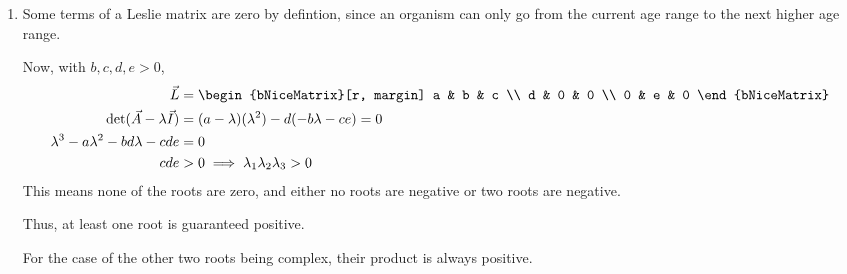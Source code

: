 \begin{enumerate}
    \item Some terms of a Leslie matrix are zero by defintion, since an organism
          can only go from the current age range to the next higher age range. \par
          Now, with $ b,c,d,e > 0 $,
          \begin{align}
              \vec{L}                        & =
              \begin{bNiceMatrix}[r, margin]
                  a & b & c \\
                  d & 0 & 0 \\
                  0 & e & 0
              \end{bNiceMatrix}                              \\
              \det(\vec{A} - \lambda\vec{I}) & = (a-\lambda) (\lambda^2)
              - d(-b\lambda - ce) = 0                                    \\
              \lambda^3 - a\lambda^2
              - bd\lambda - cde              & = 0                       \\
              cde                            & > 0 \implies
              \lambda_1 \lambda_2 \lambda_3  > 0
          \end{align}
          This means none of the roots are zero, and either no roots are negative or
          two roots are negative. \par
          Thus, at least one root is guaranteed positive. \par
          For the case of the other two roots being complex, their product is always
          positive.

\end{enumerate}